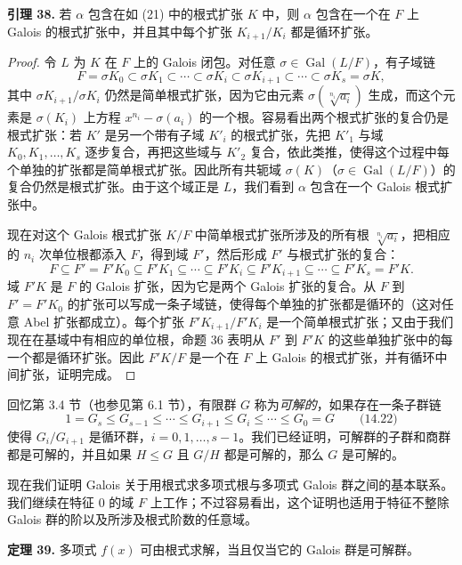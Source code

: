 \noindent\textbf{引理 38.} 若 $\alpha$ 包含在如 (21) 中的根式扩张 $K$ 中，则 $\alpha$ 包含在一个在 $F$ 上 Galois 的根式扩张中，并且其中每个扩张 $K_{i+1}/K_i$ 都是循环扩张。

\begin{proof}
令 $L$ 为 $K$ 在 $F$ 上的 Galois 闭包。对任意 $\sigma\in\operatorname{Gal}(L/F)$，有子域链
\[
F=\sigma K_0\subset \sigma K_1\subset\cdots\subset \sigma K_i\subset \sigma K_{i+1}\subset\cdots\subset \sigma K_s=\sigma K,
\]
其中 $\sigma K_{i+1}/\sigma K_i$ 仍然是简单根式扩张，因为它由元素 $\sigma(\sqrt[n_i]{a_i})$ 生成，而这个元素是 $\sigma(K_i)$ 上方程 $x^{n_i}-\sigma(a_i)$ 的一个根。容易看出两个根式扩张的复合仍是根式扩张：若 $K'$ 是另一个带有子域 $K'_i$ 的根式扩张，先把 $K'_1$ 与域 $K_0,K_1,\ldots,K_s$ 逐步复合，再把这些域与 $K'_2$ 复合，依此类推，使得这个过程中每个单独的扩张都是简单根式扩张。因此所有共轭域 $\sigma(K)$（$\sigma\in\operatorname{Gal}(L/F)$）的复合仍然是根式扩张。由于这个域正是 $L$，我们看到 $\alpha$ 包含在一个 Galois 根式扩张中。

现在对这个 Galois 根式扩张 $K/F$ 中简单根式扩张所涉及的所有根 $\sqrt[n_i]{a_i}$，把相应的 $n_i$ 次单位根都添入 $F$，得到域 $F'$，然后形成 $F'$ 与根式扩张的复合：
\[
F\subseteq F'=F'K_0\subseteq F'K_1\subseteq\cdots\subseteq F'K_i\subseteq F'K_{i+1}\subseteq\cdots\subseteq F'K_s=F'K.
\]
域 $F'K$ 是 $F$ 的 Galois 扩张，因为它是两个 Galois 扩张的复合。从 $F$ 到 $F'=F'K_0$ 的扩张可以写成一条子域链，使得每个单独的扩张都是循环的（这对任意 Abel 扩张都成立）。每个扩张 $F'K_{i+1}/F'K_i$ 是一个简单根式扩张；又由于我们现在在基域中有相应的单位根，命题 36 表明从 $F'$ 到 $F'K$ 的这些单独扩张中的每一个都是循环扩张。因此 $F'K/F$ 是一个在 $F$ 上 Galois 的根式扩张，并有循环中间扩张，证明完成。
\end{proof}

回忆第 3.4 节（也参见第 6.1 节），有限群 $G$ 称为\emph{可解的}，如果存在一条子群链
\[
1=G_s\leq G_{s-1}\leq\cdots\leq G_{i+1}\leq G_i\leq\cdots\leq G_0=G \qquad\text{(14.22)}
\]
使得 $G_i/G_{i+1}$ 是循环群，$i=0,1,\ldots,s-1$。我们已经证明，可解群的子群和商群都是可解的，并且如果 $H\leq G$ 且 $G/H$ 都是可解的，那么 $G$ 是可解的。

现在我们证明 Galois 关于用根式求多项式根与多项式 Galois 群之间的基本联系。我们继续在特征 $0$ 的域 $F$ 上工作；不过容易看出，这个证明也适用于特征不整除 Galois 群的阶以及所涉及根式阶数的任意域。

\noindent\textbf{定理 39.} 多项式 $f(x)$ 可由根式求解，当且仅当它的 Galois 群是可解群。

